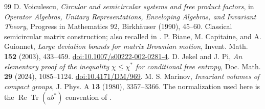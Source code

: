 \documentclass[11pt]{article}
\theoremstyle{definition}\newtheorem{definition}[theorem]{Definition}
\theoremstyle{remark}\newtheorem{remark}[theorem]{Remark}
\DeclareMathOperator{\Tr}{Tr}\DeclareMathOperator{\tr}{tr}
\DeclareMathOperator{\Rea}{Re}\DeclareMathOperator{\Ima}{Im}
\begin{document}
\begin{thebibliography}{99}
 D. Voiculescu,
\emph{Circular and semicircular systems and free product factors},
in \emph{Operator Algebras, Unitary Representations, Enveloping Algebras,
and Invariant Theory}, Progress in Mathematics 92, Birkh\"auser (1990),
45--60. Classical semicircular matrix construction; also recalled in
\cite{NSSentropy,NSSfisher}.
 P. Biane, M. Capitaine, and A. Guionnet,
\emph{Large deviation bounds for matrix Brownian motion},
Invent. Math. \textbf{152} (2003), 433--459.
\href{https://doi.org/10.1007/s00222-002-0281-4}{doi:10.1007/s00222-002-0281-4}.
 D. Jekel and J. Pi,
\emph{An elementary proof of the inequality $\chi\leq\chi^*$ for
conditional free entropy}, Doc. Math. \textbf{29} (2024), 1085--1124.
\href{https://doi.org/10.4171/DM/969}{doi:10.4171/DM/969}.
 M. S. Marinov,
\emph{Invariant volumes of compact groups}, J. Phys. A \textbf{13}
(1980), 3357--3366. The normalization used here is the
$\Rea\Tr(ab^*)$ convention of \cite[Lemma 2.8]{NSSentropy}.
\end{thebibliography}
\end{document}
